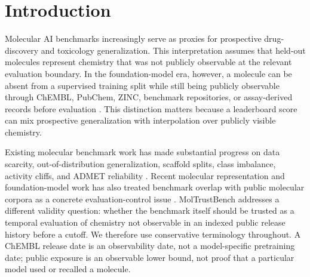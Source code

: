 \documentclass[unnumsec,webpdf,contemporary,large,numbered]{oup-authoring-template}
\begin{document}

\maketitle

\section{Introduction}

Molecular AI benchmarks increasingly serve as proxies for prospective drug-discovery and toxicology generalization. This interpretation assumes that held-out molecules represent chemistry that was not publicly observable at the relevant evaluation boundary. In the foundation-model era, however, a molecule can be absent from a supervised training split while still being publicly observable through ChEMBL, PubChem, ZINC, benchmark repositories, or assay-derived records before evaluation \cite{chembl2012,chembl2019,chembl2023,chemblDownloads2025,pubchem2019,zinc2020}. This distinction matters because a leaderboard score can mix prospective generalization with interpolation over publicly visible chemistry.

Existing molecular benchmark work has made substantial progress on data scarcity, out-of-distribution generalization, scaffold splits, class imbalance, activity cliffs, and ADMET reliability \cite{moleculenet2018,tdc2021,ogb2020,wallach2018,sheridan2013,moleculeace2023,deeptox2016,boom2025}. Recent molecular representation and foundation-model work has also treated benchmark overlap with public molecular corpora as a concrete evaluation-control issue \cite{yang2019representation,hu2020pretraining,mole2024}. MolTrustBench addresses a different validity question: whether the benchmark itself should be trusted as a temporal evaluation of chemistry not observable in an indexed public release history before a cutoff. We therefore use conservative terminology throughout. A ChEMBL release date is an observability date, not a model-specific pretraining date; public exposure is an observable lower bound, not proof that a particular model used or recalled a molecule.
\end{document}

